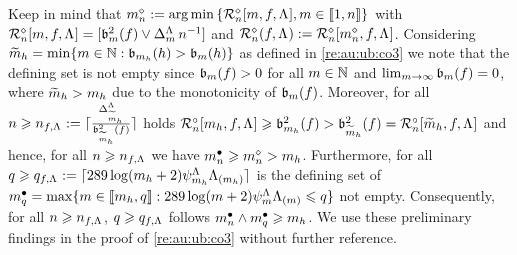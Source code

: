 \begin{rem}\label{rem:au:ub:co3}Keep in mind that
$\aDi{\ssY}:=\argmin\Nset[{\Di\in\nset{1,\ssY}}]{\hRaDi{\Di,\xdf,\iSv}}$
with $\hRaDi{\Di,\xdf,\iSv}=[\bias^2(\xdf)\vee \DipenSv\,\ssY^{-1}]$
and $\hRa{\xdf,\iSv}:=\hRaDi{\aDi{\ssY},\xdf,\iSv}$.
Considering 
$\tDi_{\ydf}=\min\{\Di\in\Nz:\bias[\Di_{\ydf}](\ydf)>\bias[\Di](\ydf)\}$
as defined in \cref{re:au:ub:co3} we note that the defining set is not empty since $\bias[\Di](\xdf)>0$ for all
$\Di\in\Nz$ and $\lim_{\Di\to\infty}\bias[\Di](\xdf)=0$, where
$\tDi_{\ydf}>\Di_{\ydf}$ due to the  monotonicity of
$\bias(\xdf)$. Moreover, for all
$\ssY\geq\ssY_{\xdf,\iSv}:=\ceil{\tfrac{\DipenSv[\tDi_{\ydf}]}{\bias[\tDi_{\ydf}]^2(\xdf)}}$
 holds 
$\oRaDi{\Di_{\ydf},\xdf,\iSv}\geq\bias[\Di_{\ydf}]^2(\xdf)>\bias[\tDi_{\ydf}]^2(\xdf)
=\oRaDi{\tDi_{\ydf},\xdf,\iSv}$
and hence, for all
$\ssY\geq\ssY_{\xdf,\iSv}$ we have $\sDi{\ssY}\geq\aDi{\ssY}>
\Di_{\ydf}$. Furthermore, for all $\ssE\geq \ssE_{\xdf,\iSv}:=\ceil{289\log(\Di_{\ydf}+2)\cmiSv[\Di_{\ydf}]\miSv[\Di_{\ydf}]}$
is the defining set of
$\sDi{\ssE}=\max\{\Di\in\nset{\Di_{\ydf},\ssE}:289\log(\Di+2)\cmiSv[\Di]\miSv[\Di]\leq\ssE\}$
not empty.  Consequently, for all $\ssY\geq\ssY_{\xdf,\iSv}$, $\ssE\geq\ssE_{\xdf,\iSv}$
follows $\sDi{\ssY}\wedge\sDi{\ssE}\geq \Di_{\ydf}$.  We use these
preliminary findings in the proof of \cref{re:au:ub:co3} without
further reference.  
\end{rem}
